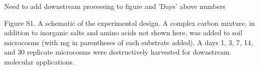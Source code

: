 Need to add downstream processing to figure and 'Days' above numbers 

Figure S1. A schematic of the experimental design.  A complex carbon mixture, in addition to inorganic salts and amino acids not shown here, was added to soil microcosms (with mg in parentheses of each substrate added). A days 1, 3, 7, 14, and 30 replicate microcosms were destructively harvested for downstream molecular applications.   